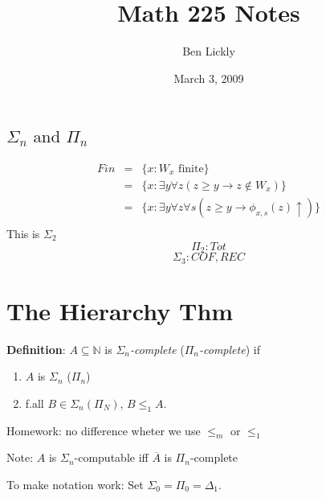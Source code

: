 \documentclass[12pt]{article}
\author{Ben Lickly}
\date{March 3, 2009}
\title{Math 225 Notes}
\newcommand{\Nat}{\ensuremath{\mathbb{N}}}
\newcommand{\Conj}[1]{\ensuremath{\overline{#1}}}
\newcommand{\defn}{\textbf{Definition}: }
\begin{document}
\maketitle

\subsection*{$\Sigma_n \text{ and } \Pi_n$}
\begin{align*}
 Fin &=& \{ x : W_x \text{ finite} \} \\
 &=& \{x : \exists y \forall z (z \ge y \rightarrow z \not\in W_x) \} \\
 &=& \{x : \exists y \forall z \forall s (z \ge y \rightarrow \phi_{x,s}(z) \uparrow) \} \\
\end{align*}
This is $\Sigma_2$
\[
 \Pi_2: Tot
\]
\[
 \Sigma_3: COF, REC
\]

\section*{The Hierarchy Thm}
\defn $A \subseteq \Nat$ is \emph{$\Sigma_n$-complete} (\emph{$\Pi_n$-complete}) if
\begin{enumerate}[(1)]
 \item $A$ is $\Sigma_n$ ($\Pi_n$)
 \item f.all $B \in \Sigma_n (\Pi_N)$, $B \le_1 A$.
\end{enumerate}
Homework: no difference wheter we use $\le_m$ or $\le_1$

Note: $A$ is $\Sigma_n$-computable iff $\Conj{A}$ is $\Pi_n$-complete

To make notation work: Set $\Sigma_0 = \Pi_0 = \Delta_1$.
\end{document}
